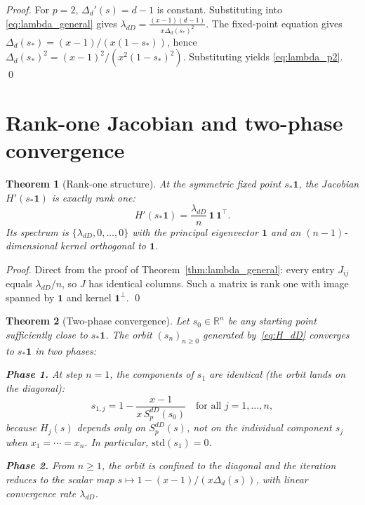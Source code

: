\documentclass[11pt,a4paper]{article}
\newtheorem{theorem}{Theorem}
\theoremstyle{definition}
\theoremstyle{remark}
\newcommand{\R}{\mathbb{R}}
\newcommand{\one}{\mathbf{1}}
\begin{document}
\begin{proof}
For $p = 2$, $\Delta_d'(s) = d - 1$ is constant.  Substituting into
\eqref{eq:lambda_general} gives $\lambda_{dD} = \frac{(x-1)(d-1)}{x \Delta_d(s_*)^2}$.
The fixed-point equation gives $\Delta_d(s_*) = (x-1)/(x(1-s_*))$, hence
$\Delta_d(s_*)^2 = (x-1)^2/(x^2 (1-s_*)^2)$.  Substituting yields
\eqref{eq:lambda_p2}. \qed
\end{proof}

\section{Rank-one Jacobian and two-phase convergence}
\label{sec:rank1}

\begin{theorem}[Rank-one structure]
\label{thm:rank1}
At the symmetric fixed point $s_* \one$, the Jacobian
$H'(s_* \one)$ is exactly rank one:
\[
  H'(s_* \one) = \frac{\lambda_{dD}}{n}\, \one\, \one^\top.
\]
Its spectrum is $\{\lambda_{dD}, 0, \ldots, 0\}$ with the principal
eigenvector $\one$ and an $(n-1)$-dimensional kernel orthogonal to
$\one$.
\end{theorem}

\begin{proof}
Direct from the proof of Theorem~\ref{thm:lambda_general}: every entry
$J_{ij}$ equals $\lambda_{dD}/n$, so $J$ has identical columns.  Such a
matrix is rank one with image spanned by $\one$ and kernel
$\one^\perp$. \qed
\end{proof}

\begin{theorem}[Two-phase convergence]
\label{thm:two_phase}
Let $s_0 \in \R^n$ be any starting point sufficiently close to $s_* \one$.
The orbit $(s_n)_{n \geq 0}$ generated by~\eqref{eq:H_dD} converges to
$s_* \one$ in two phases:

\noindent\textbf{Phase 1.}  At step $n = 1$, the components of $s_1$ are
identical (the orbit lands on the diagonal):
\[
  s_{1, j} = 1 - \frac{x - 1}{x\, S_p^{dD}(s_0)} \quad \text{for all } j = 1, \ldots, n,
\]
because $H_j(s)$ depends only on $S_p^{dD}(s)$, not on the individual
component $s_j$ when $x_1 = \cdots = x_n$.  In particular,
$\mathrm{std}(s_1) = 0$.

\noindent\textbf{Phase 2.}  From $n \geq 1$, the orbit is confined to the
diagonal and the iteration reduces to the scalar map $s \mapsto
1 - (x-1)/(x \Delta_d(s))$, with linear convergence rate
$\lambda_{dD}$.
\end{theorem}
\end{document}
